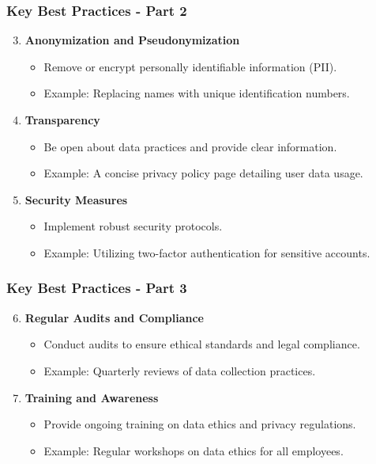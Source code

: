\documentclass[aspectratio=169]{beamer}
\begin{document}
\begin{frame}[fragile]
    \frametitle{Key Best Practices - Part 2}
    \begin{enumerate}
        \setcounter{enumi}{2}
        \item \textbf{Anonymization and Pseudonymization}
            \begin{itemize}
                \item Remove or encrypt personally identifiable information (PII).
                \item Example: Replacing names with unique identification numbers.
            \end{itemize}
        \item \textbf{Transparency}
            \begin{itemize}
                \item Be open about data practices and provide clear information.
                \item Example: A concise privacy policy page detailing user data usage.
            \end{itemize}
        \item \textbf{Security Measures}
            \begin{itemize}
                \item Implement robust security protocols.
                \item Example: Utilizing two-factor authentication for sensitive accounts.
            \end{itemize}
    \end{enumerate}
\end{frame}

\begin{frame}[fragile]
    \frametitle{Key Best Practices - Part 3}
    \begin{enumerate}
        \setcounter{enumi}{5}
        \item \textbf{Regular Audits and Compliance}
            \begin{itemize}
                \item Conduct audits to ensure ethical standards and legal compliance.
                \item Example: Quarterly reviews of data collection practices.
            \end{itemize}
        \item \textbf{Training and Awareness}
            \begin{itemize}
                \item Provide ongoing training on data ethics and privacy regulations.
                \item Example: Regular workshops on data ethics for all employees.
            \end{itemize}
    \end{enumerate}
\end{frame}
\end{document}
